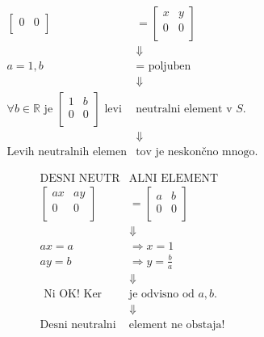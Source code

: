 \begin{enumerate}[label=\alph*)]
\begin{align*}
\begin{bmatrix}
            0 & 0 \\
        \end{bmatrix}
        &= 
        \begin{bmatrix}
            x & y \\
            0 & 0 \\
        \end{bmatrix} \\
        &\Downarrow \\
        a = 1, b &= \text{ poljuben } \\
        &\Downarrow \\
        \forall b \in \mathbb{R} \text{ je }
        \begin{bmatrix}
            1 & b \\
            0 & 0 \\    
        \end{bmatrix} 
        \text{ levi } & \text{neutralni element v } S. \\
        &\Downarrow \\
        \text{Levih neutralnih elemen} & \text{tov je neskončno mnogo.}
    \end{align*}

    \begin{align*}
        \text{DESNI NEUTR} & \text{ALNI ELEMENT} \\[1em]
        \begin{bmatrix}
            ax & ay \\
            0 & 0 \\
        \end{bmatrix}
        &= 
        \begin{bmatrix}
            a & b \\
            0 & 0 \\
        \end{bmatrix} \\
        & \Downarrow \\
        ax = a & \Rightarrow x = 1 \\
        ay = b & \Rightarrow y = \frac{b}{a} \\
        & \Downarrow \\
        \text{ Ni OK! Ker } & \text{je odvisno od } a, b. \\
        & \Downarrow \\
        \text{Desni neutralni } & \text{element ne obstaja!}        
    \end{align*}
\end{enumerate}

